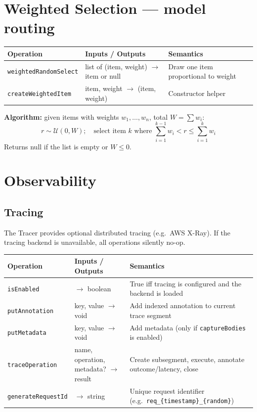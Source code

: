 \documentclass[10pt,letterpaper]{article}
\newcommand{\fn}[1]{\texttt{#1}}
\newcommand{\fld}[1]{\texttt{#1}}
\begin{document}
\section*{{\color{utilorange}Weighted Selection} \normalfont\small--- model routing}

\begin{tabular}{@{}l l p{6.5cm}@{}}
\toprule
\textbf{Operation} & \textbf{Inputs / Outputs} & \textbf{Semantics} \\
\midrule
\fn{weightedRandomSelect} & list of (item, weight) $\to$ item or null & Draw one item proportional to weight \\
\fn{createWeightedItem} & item, weight $\to$ (item, weight) & Constructor helper \\
\bottomrule
\end{tabular}

\medskip
\noindent\textbf{Algorithm:} given items with weights $w_1, \ldots, w_n$, total $W = \sum w_i$:
$$r \sim \mathcal{U}(0, W); \quad \text{select item } k \text{ where } \sum_{i=1}^{k-1} w_i < r \le \sum_{i=1}^{k} w_i$$
Returns null if the list is empty or $W \le 0$.

\section*{{\color{tracebrown}Observability}}

\subsection*{Tracing}

The Tracer provides optional distributed tracing (e.g.\ AWS X-Ray). If the tracing backend is unavailable, all operations silently no-op.

\smallskip
\begin{tabular}{@{}l l p{6.5cm}@{}}
\toprule
\textbf{Operation} & \textbf{Inputs / Outputs} & \textbf{Semantics} \\
\midrule
\fn{isEnabled} & $\to$ boolean & True iff tracing is configured and the backend is loaded \\
\fn{putAnnotation} & key, value $\to$ void & Add indexed annotation to current trace segment \\
\fn{putMetadata} & key, value $\to$ void & Add metadata (only if \fld{captureBodies} is enabled) \\
\fn{traceOperation} & name, operation, metadata? $\to$ result & Create subsegment, execute, annotate outcome/latency, close \\
\fn{generateRequestId} & $\to$ string & Unique request identifier (e.g.\ \texttt{req\_\{timestamp\}\_\{random\}}) \\
\bottomrule
\end{tabular}
\end{document}
